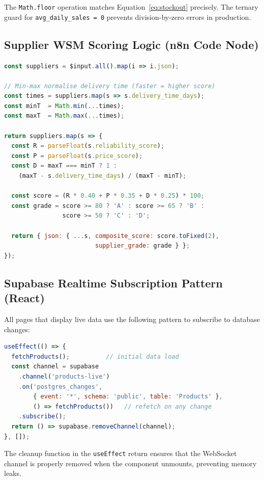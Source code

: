 The \texttt{Math.floor} operation matches Equation~\ref{eq:stockout} precisely. The ternary
guard for \texttt{avg\_daily\_sales = 0} prevents division-by-zero errors in production.

\subsection{Supplier WSM Scoring Logic (n8n Code Node)}

\begin{lstlisting}[language=javascript, caption={WF-06 Weighted Sum Model Scoring}, label={lst:wsm}]
const suppliers = $input.all().map(i => i.json);

// Min-max normalise delivery time (faster = higher score)
const times = suppliers.map(s => s.delivery_time_days);
const minT  = Math.min(...times);
const maxT  = Math.max(...times);

return suppliers.map(s => {
  const R = parseFloat(s.reliability_score);
  const P = parseFloat(s.price_score);
  const D = maxT === minT ? 1 :
    (maxT - s.delivery_time_days) / (maxT - minT);

  const score = (R * 0.40 + P * 0.35 + D * 0.25) * 100;
  const grade = score >= 80 ? 'A' : score >= 65 ? 'B' :
                score >= 50 ? 'C' : 'D';

  return { json: { ...s, composite_score: score.toFixed(2),
                         supplier_grade: grade } };
});
\end{lstlisting}

\subsection{Supabase Realtime Subscription Pattern (React)}

All pages that display live data use the following pattern to subscribe to database changes:

\begin{lstlisting}[language=javascript, caption={Supabase Realtime Subscription Pattern}, label={lst:realtime}]
useEffect(() => {
  fetchProducts();          // initial data load
  const channel = supabase
    .channel('products-live')
    .on('postgres_changes',
        { event: '*', schema: 'public', table: 'Products' },
        () => fetchProducts())   // refetch on any change
    .subscribe();
  return () => supabase.removeChannel(channel);
}, []);
\end{lstlisting}

The cleanup function in the \texttt{useEffect} return ensures that the WebSocket channel is
properly removed when the component unmounts, preventing memory leaks.

